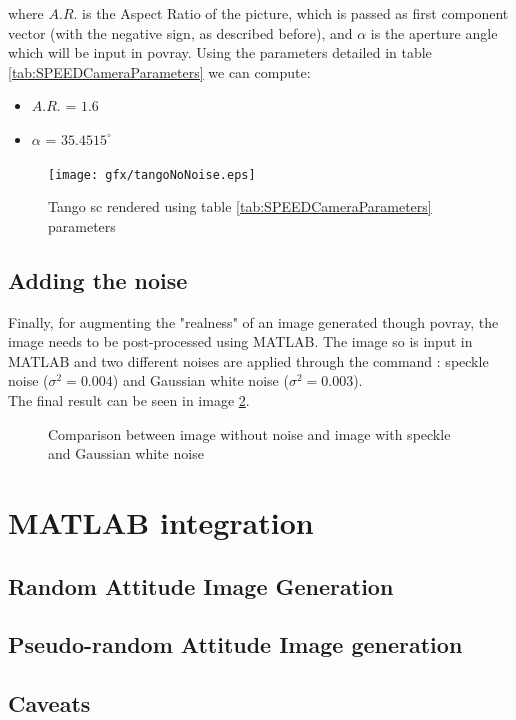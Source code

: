 where $A.R.$ is the Aspect Ratio of the picture, which is passed as first component  vector (with the negative sign, as described before), and $\alpha$ is the aperture angle which will be input in \acrshort{povray}.
Using the parameters detailed in table \ref{tab:SPEEDCameraParameters} we can compute:
\begin{itemize}
\item $A.R.$ = $1.6$
\item $\alpha$ = $35.4515 ^{\circ}$
\end{itemize}

\begin{figure}[H]
\centering
\texttt{[image: gfx/tangoNoNoise.eps]}
\caption{Tango \acrshort{sc} rendered using table \ref{tab:SPEEDCameraParameters} parameters}
\label{fig:tangoNoNoise}
\end{figure}

\subsection{Adding the noise}
Finally, for augmenting the "realness" of an image generated though \acrshort{povray}, the image needs to be post-processed using MATLAB.
The image so is input in MATLAB and two different noises are applied through the  command : speckle noise ($\sigma^2 = 0.004$) and Gaussian white noise ($\sigma^2 = 0.003$).\\
The final result can be seen in image \ref{fig:comparisonNoise}.

\begin{figure}[H]
    \centering
        \qquad
        \caption{Comparison between image without noise and image with speckle and Gaussian white noise}
    \label{fig:comparisonNoise}
\end{figure}

\section{MATLAB integration}

\subsection{Random Attitude Image Generation}

\subsection{Pseudo-random Attitude Image generation}

\subsection{Caveats}
